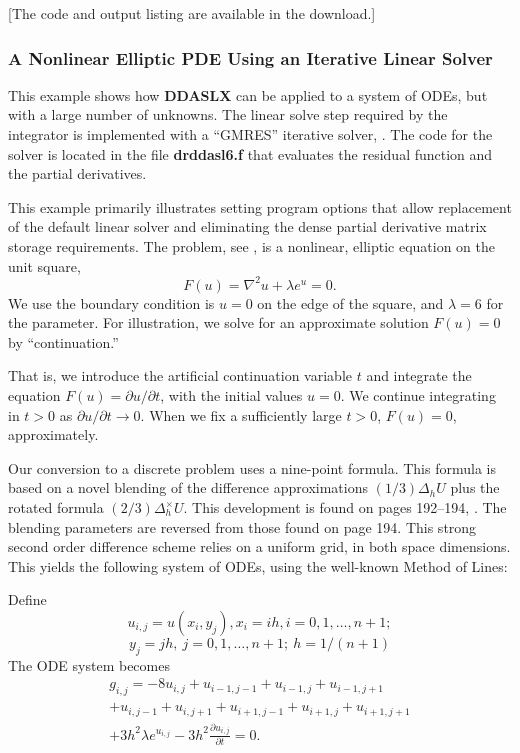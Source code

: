 \documentclass[twoside]{MATH77}
\begin{document}
[The code and output listing are available in the download.]

\subsubsection{A Nonlinear Elliptic PDE Using an Iterative Linear Solver}

This example shows how \textbf{DDASLX} can be applied to a system of ODEs, but
with a large number of unknowns.  The linear solve step required by the
integrator is implemented with a ``GMRES'' iterative solver,
\cite{Golub:1996:GVL}.  The code for the solver is located in the file
\textbf{drddasl6.f} that evaluates the residual function and the partial
derivatives.

This example primarily illustrates setting program options that allow
replacement of the default linear solver and eliminating the dense partial
derivative matrix storage requirements.  The problem, see
\cite{Hayder:1997:HKM}, is a nonlinear, elliptic equation on the unit square,
\begin{equation*}
  F(u)=\nabla^2 u+\lambda e^u=0.
\end{equation*}
We use the boundary condition is $u=0$ on the edge of the square, and
$\lambda=6$ for the parameter.  For illustration, we solve for an approximate
solution $F(u)=0$ by ``continuation.''

That is, we introduce the artificial continuation variable $t$ and integrate
the equation $F(u)=\partial u/\partial t$, with the initial values
$u=0$.  We continue integrating in $t>0$ as $\partial u/\partial t
\rightarrow 0$.  When we fix a sufficiently large $t>0$, $F(u)=0$,
approximately.

Our conversion to a discrete problem uses a nine-point formula.  This formula
is based on a novel blending of the difference approximations $(1/3)\Delta_h
U$ plus the rotated formula $(2/3)\Delta_h^\times U$.  This development is
found on pages 192--194, \cite{Forsythe:1960:FWW}. The blending parameters are
reversed from those found on page 194.  This strong second order difference
scheme relies on a uniform grid, in both space dimensions.  This yields the
following system of ODEs, using the well-known Method of Lines:

Define
\begin{equation*}
  u_{i,j}=u(x_i,y_j), x_i=ih, i=0,1,\ldots, n+1;
\end{equation*}
\begin{equation*}
  y_j=jh,\ j=0,1,\ldots,n+1;\ h=1/(n+1)
\end{equation*}
The ODE system becomes
\begin{multline*}
  g_{i,j} = -8u_{i,j} + u_{i-1,j-1} + u_{i-1,j} + u_{i-1,j+1}\\
  + u_{i,j-1} + u_{i,j+1} + u_{i+1,j-1} + u_{i+1,j} + u_{i+1,j+1}\\
  + 3h^2\lambda e^{u_{i,j}}-3h^2 \frac{\partial u_{i,j}}{\partial t}=0.
\end{multline*}
\end{document}
